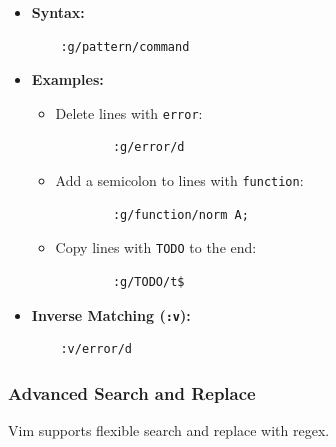 \documentclass{article}
\begin{document}
\begin{itemize}
    \item \textbf{Syntax:}
    \begin{verbatim}
    :g/pattern/command
    \end{verbatim}

    \item \textbf{Examples:}
    \begin{itemize}
        \item Delete lines with \texttt{error}:
        \begin{verbatim}
        :g/error/d
        \end{verbatim}

        \item Add a semicolon to lines with \texttt{function}:
        \begin{verbatim}
        :g/function/norm A;
        \end{verbatim}

        \item Copy lines with \texttt{TODO} to the end:
        \begin{verbatim}
        :g/TODO/t$
        \end{verbatim}
    \end{itemize}

    \item \textbf{Inverse Matching (\texttt{:v}):}
    \begin{verbatim}
    :v/error/d
    \end{verbatim}
\end{itemize}

\subsubsection{Advanced Search and Replace}
Vim supports flexible search and replace with regex.
\end{document}
